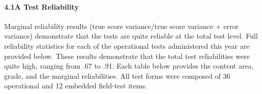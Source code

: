 \documentclass[]{article}
\let\oldparagraph\paragraph
\renewcommand{\paragraph}[1]{\oldparagraph{#1}\mbox{}}
\begin{document}
\hypertarget{a-test-reliability}{%
\paragraph{4.1A Test Reliability}\label{a-test-reliability}}

Marginal reliability results (true score variance/true score variance +
error variance) demonstrate that the tests are quite reliable at the
total test level. Full reliability statistics for each of the
operational tests administered this year are provided below. These
results demonstrate that the total test reliabilities were quite high,
ranging from .67 to .91. Each table below provides the content area,
grade, and the marginal reliabilities. All test forms were composed of
36 operational and 12 embedded field-test items.
\end{document}
